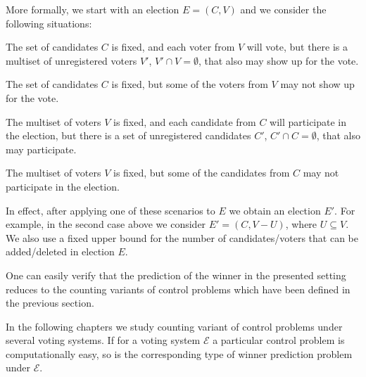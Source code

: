 More formally, we start with an election $E=(C,V)$ and we consider the following situations:
\begin{Enumerate}
    \item The set of candidates $C$ is fixed, and each voter from $V$ will vote, but there is a multiset of unregistered voters $V'$, $V'\cap V=\emptyset$, that also may show up for the vote.
	\item The set of candidates $C$ is fixed, but some of the voters from $V$ may not show up for the vote.
	\item The multiset of voters $V$ is fixed, and each candidate from $C$ will participate in the election, but there is a set of unregistered candidates $C'$, $C'\cap C=\emptyset$, that also may participate.
	\item The multiset of voters $V$ is fixed, but some of the candidates from $C$ may not participate in the election.
\end{Enumerate}
In effect, after applying one of these scenarios to $E$ we obtain an election $E'$.
For example, in the second case above we consider $E'=(C,V-U)$, where $U\subseteq V$.
We also use a fixed upper bound for the number of candidates/voters that can be added/deleted in election $E$.

One can easily verify that the prediction of the winner in the presented setting reduces to the counting variants of control problems which have been defined in the previous section.

In the following chapters we study counting variant of control problems under several voting systems.
If for a voting system $\mathcal{E}$ a particular control problem is computationally easy, so is the corresponding type of winner prediction problem under $\mathcal{E}$.

